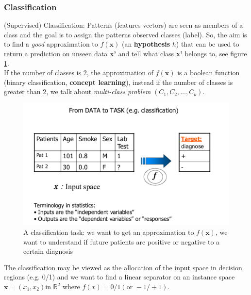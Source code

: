 \documentclass[../main.tex]{subfiles}
\begin{document}
\subsubsection{Classification}
(Supervised) Classification: Patterns (features vectors) are seen as members of a class and the goal is to assign the patterns observed classes (label). So, the aim is to find a \emph{good} approximation to $f(\textbf{x})$ (an \textbf{hypothesis} $h$) that can be used to return a prediction on unseen data \textbf{x'} and tell what class \textbf{x'} belongs to, see figure \ref{fig:intro_classification_exp1}.\\

If the number of classes is 2, the approximation of $f(\textbf{x})$ is a boolean function (binary classification, \textbf{concept learning}), instead if the number of classes is greater than 2, we talk about \emph{multi-class problem} $(C_1, C_2, \dots, C_k)$.\\

\begin{figure}
    \centering
    \includegraphics[scale = 0.5]{lectures/1_Introduction/intro_classification_1.png}
    \caption{A classification task: we want to get an approximation to $f(\mathbf{x})$, we want to understand if future patients are positive or negative to a certain diagnosis}
    \label{fig:intro_classification_exp1}
\end{figure}

The classification may be viewed as the allocation of the input space in decision regions (e.g. 0/1) and we want to find a linear separator on an instance space $\mathbf{x} = (x_1, x_2) \text{in } \mathbb{R}^2$ where $f(x)= 0/1 (\text{or } -1/+1 )$. 
\end{document}
